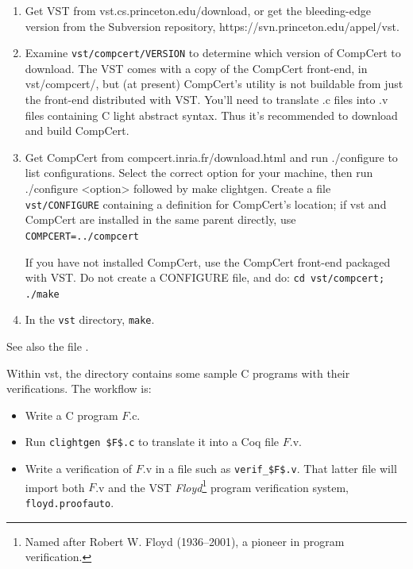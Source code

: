 \documentclass[12pt,fleqn,openany,oneside,showtrims]{memoir}
\begin{document}
\begin{enumerate}\setlength\itemsep{0pt}
\item  Get VST from \textsf{vst.cs.princeton.edu/download},
or get the bleeding-edge version from the Subversion repository,\newline
\textsf{https://svn.princeton.edu/appel/vst}.
\item Examine \lstinline{vst/compcert/VERSION} to determine which
version of CompCert to download.
The VST comes with a copy of the CompCert front-end, in vst/compcert/,
but (at present) CompCert's  utility is not buildable
from just the front-end distributed with VST.  You'll need 
to translate .c files into .v files containing C light abstract syntax.
Thus it's recommended to download
and build CompCert.

\item Get CompCert from \textsf{compcert.inria.fr/download.html}
and run \textsf{./configure} to list configurations. Select the correct option
for your machine, then run \textsf{./configure <option>} followed by \newline
\textsf{make clightgen}.
Create a file \lstinline{vst/CONFIGURE} containing a definition for CompCert's location;
if vst and CompCert are installed in the same
parent directly, use \lstinline{COMPCERT=../compcert}

If you have  not installed CompCert,
use the CompCert front-end packaged with VST.
Do not create a CONFIGURE file, and do:\newline
\lstinline{cd vst/compcert; ./make}  

\item In the \lstinline{vst} directory, \lstinline{make}.
\end{enumerate}
See also the file .

Within vst, the  directory contains some sample C programs
with their verifications.  The workflow is:
\begin{itemize}
\item Write a C program $F$.c.
\item Run \lstinline{clightgen $F$.c} to translate it into a Coq
file $F$.v.
\item Write a verification of $F$.v in a file such as
\lstinline{verif_$F$.v}.  That latter file will import
both $F$.v and the VST \emph{Floyd}\footnote{Named after Robert W. Floyd (1936--2001), a pioneer in program verification.} program verification system,
\lstinline{floyd.proofauto}.
\end{itemize}
\end{document}
